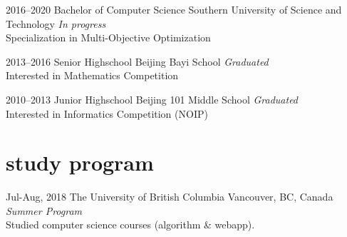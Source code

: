 \documentclass[]{friggeri-cv-a4}
\begin{document}
\begin{entrylist}




\entry
{2016--2020}
{Bachelor {\normalfont of Computer Science}}
{Southern University of Science and Technology}
{\emph{In progress}\\
Specialization in Multi-Objective Optimization}


\entry
{2013--2016}
{Senior {\normalfont Highschool}}
{Beijing Bayi School}
{\emph{Graduated}\\
Interested in Mathematics Competition}


\entry
{2010--2013}
{Junior {\normalfont Highschool}}
{Beijing 101 Middle School}
{\emph{Graduated}\\
Interested in Informatics Competition (NOIP)}


\end{entrylist}


\section{study program}

\begin{entrylist}

\entry
{Jul-Aug, 2018}
{The University of British Columbia}
{Vancouver, BC, Canada}
{\emph{Summer Program} \\
Studied computer science courses (algorithm \& webapp).}




\end{entrylist}
\end{document}
